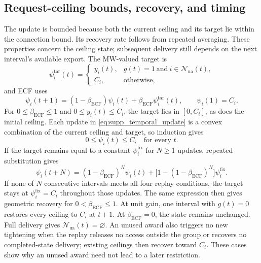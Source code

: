 \documentclass[11pt]{article}
\begin{document}
\subsection{Request-ceiling bounds, recovery, and timing}
\label{supp:full_ecf_temporal_proof}

The update is bounded because both the current ceiling and its target lie
within the connection bound. Its recovery rate follows from repeated averaging.
These properties concern the ceiling state; subsequent delivery still depends
on the next interval's available export. The MW-valued target is
\begin{equation}
\psi_i^{\mathrm{tar}}(t)=
\begin{cases}
y_i(t),&g(t)=1\ \text{and}\ i\in\mathcal N_{\mathrm{ua}}(t),\\
C_i,&\text{otherwise},
\end{cases}
\label{eq:supp_ceiling_target}
\end{equation}
and ECF uses
\begin{equation}
\psi_i(t+1)=(1-\beta_{\mathrm{ECF}})\psi_i(t)
+\beta_{\mathrm{ECF}}\psi_i^{\mathrm{tar}}(t),
\qquad \psi_i(1)=C_i.
\label{eq:supp_temporal_update}
\end{equation}
For $0\le\beta_{\mathrm{ECF}}\le1$ and $0\le y_i(t)\le C_i$, the target lies
in $[0,C_i]$, as does the initial ceiling. Each update in
\eqref{eq:supp_temporal_update} is a convex combination of the current ceiling
and target, so induction gives
\begin{equation}
0\le\psi_i(t)\le C_i\quad\text{for every }t.
\label{eq:supp_ceiling_bounds}
\end{equation}
If the target remains equal to a constant $\psi_i^{\mathrm{fix}}$ for
$N\ge1$ updates, repeated
substitution gives
\begin{equation}
\psi_i(t+N)=(1-\beta_{\mathrm{ECF}})^N\psi_i(t)
+\bigl[1-(1-\beta_{\mathrm{ECF}})^N\bigr]\psi_i^{\mathrm{fix}}.
\label{eq:supp_temporal_closed_form}
\end{equation}
If none of $N$ consecutive intervals meets all four replay conditions, the
target stays at $\psi_i^{\mathrm{fix}}=C_i$ throughout those updates. The same
expression then gives geometric recovery for $0<\beta_{\mathrm{ECF}}\le1$. At
unit gain, one interval with $g(t)=0$ restores every ceiling to $C_i$ at $t+1$.
At
$\beta_{\mathrm{ECF}}=0$, the state remains unchanged. Full delivery gives
$\mathcal N_{\mathrm{ua}}(t)=\varnothing$. An unused award also triggers no new
tightening when the replay releases no access outside the group or recovers
no completed-state delivery; existing ceilings then recover toward $C_i$.
These cases show why an unused award need not lead to a later restriction.
\end{document}
